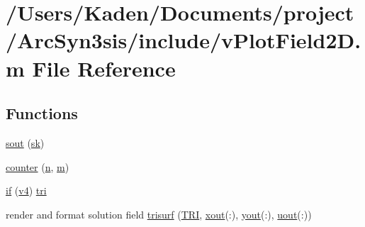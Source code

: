 \hypertarget{a00563}{}\section{/\+Users/\+Kaden/\+Documents/project/\+Arc\+Syn3sis/include/v\+Plot\+Field2D.m File Reference}
\label{a00563}
\subsection*{Functions}
\begin{DoxyCompactItemize}
\item 
\hyperlink{a00563_af37c7e7d7baefebf97f9b18e437d3a0b}{sout} (\hyperlink{a00563_ad95e1f06b6be929c6b670b2a9a80d5cc}{sk})
\item 
\hyperlink{a00563_a22845a91f919051f5ce10e0fc468c821}{counter} (\hyperlink{a00623_a781a04ab095280f838ff3eb0e51312e0}{n}, \hyperlink{a00575_ab780b65adc28bca17f186bf3eebfb21d}{m})
\item 
\hyperlink{a00563_ae338c28baa2c1bd1c7f9308a222c880f}{if} (\hyperlink{a00563_aaa05ec51c2d691a0b7560a330374e1c4}{v4}) \hyperlink{a00563_aa0c5dcb80b0d73954cf3cba7bb428081}{tri}
\item 
render and format solution field \hyperlink{a00563_a262ff24ee701ceda68e45731f3f8f5b3}{trisurf} (\hyperlink{a00563_a558baeb50ad046e899b5e64f957b043f}{T\+RI}, \hyperlink{a00563_aa43b7c30923e8fcf939fe12082a19359}{xout}(\+:), \hyperlink{a00563_a440aa7a05dec25dc6fe586eaa162395b}{yout}(\+:), \hyperlink{a00563_a5c8d8342682becd112eb9de226d6053f}{uout}(\+:))
\end{DoxyCompactItemize}
